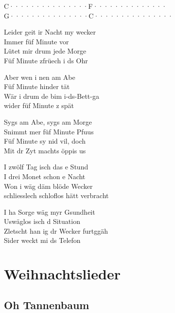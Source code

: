 \documentclass[
  letterpaper,
  twoside=false]{scrbook}
\begin{document}
\textbar C·······\textbar········\textbar F······\textbar········\textbar{}\\
\textbar G·······\textbar········\textbar C·······\textbar········\textbar{}

Leider geit ir Nacht my wecker\\
Immer füf Minute vor\\
Lütet mir drum jede Morge\\
Füf Minute z\textquotesingle früech i ds Ohr

Aber wen i nen am Abe\\
Füf Minute hinder tät\\
Wär i drum de bim i-ds-Bett-ga\\
wider füf Minute z spät

Syg\textquotesingle s am Abe, syg\textquotesingle s am Morge\\
S\textquotesingle nimmt mer füf Minute Pfuus\\
Füf Minute sy nid vil, doch\\
Mit dr Zyt macht\textquotesingle s öppis us

I zwölf Tag isch das e Stund\\
I drei Monet schon e Nacht\\
Won i wäg däm blöde Wecker\\
schliesslech schloflos hätt verbracht

I ha Sorge wäg myr Gsundheit\\
Uswäglos isch d Situation\\
Zletscht han ig dr Wecker furtggäh\\
Sider weckt mi ds Telefon

\part{Weihnachtslieder}

\hypertarget{oh-tannenbaum}{%
\chapter{Oh Tannenbaum}\label{oh-tannenbaum}}
\end{document}
